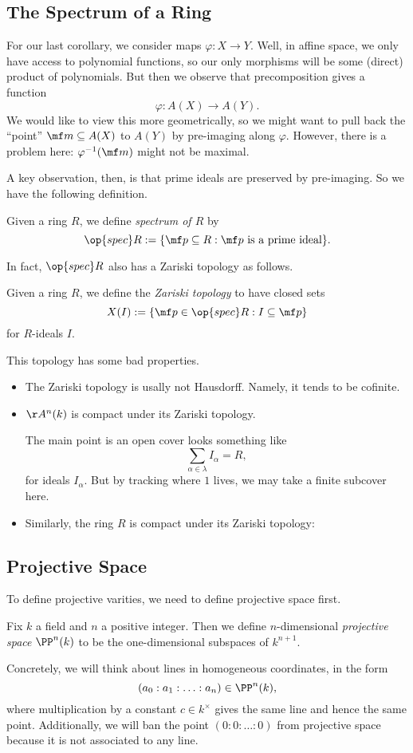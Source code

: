 \subsection{The Spectrum of a Ring}
For our last corollary, we consider maps $\varphi:X\to Y$. Well, in affine space, we only have access to polynomial functions, so our only morphisms will be some (direct) product of polynomials. But then we observe that precomposition gives a function
\[\varphi:A(X)\rightarrow A(Y).\]
We would like to view this more geometrically, so we might want to pull back the ``point'' $\mf m\subseteq A(X)$ to $A(Y)$ by pre-imaging along $\varphi$. However, there is a problem here: $\varphi^{-1}(\mf m)$ might not be maximal.

A key observation, then, is that prime ideals are preserved by pre-imaging. So we have the following definition.
\begin{definition}
	Given a ring $R$, we define \textit{spectrum of $R$} by
	\[\op{spec}R:=\{\mf p\subseteq R:\mf p\text{ is a prime ideal}\}.\]
\end{definition}
In fact, $\op{spec}R$ also has a Zariski topology as follows.
\begin{definition}
	Given a ring $R$, we define the \textit{Zariski topology} to have closed sets
	\[X(I):=\{\mf p\in\op{spec}R:I\subseteq\mf p\}\]
	for $R$-ideals $I$.
\end{definition}
This topology has some bad properties.
\begin{itemize}
	\item The Zariski topology is usally not Hausdorff. Namely, it tends to be cofinite.
	\item $\AA^n(k)$ is compact under its Zariski topology.

	The main point is an open cover looks something like
	\[\sum_{\alpha\in\lambda}I_\alpha=R,\]
	for ideals $I_\alpha$. But by tracking where $1$ lives, we may take a finite subcover here.
	\item Similarly, the ring $R$ is compact under its Zariski topology:
\end{itemize}

\subsection{Projective Space}
To define projective varities, we need to define projective space first.
\begin{definition}
	Fix $k$ a field and $n$ a positive integer. Then we define $n$-dimensional \textit{projective space} $\PP^n(k)$ to be the one-dimensional subspaces of $k^{n+1}$.
\end{definition}
Concretely, we will think about lines in homogeneous coordinates, in the form
\[(a_0:a_1:\ldots:a_n)\in\PP^n(k),\]
where multiplication by a constant $c\in k^\times$ gives the same line and hence the same point. Additionally, we will ban the point $(0:0:\ldots:0)$ from projective space because it is not associated to any line.

